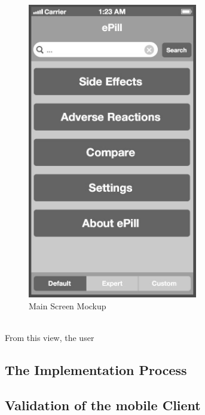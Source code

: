 \begin{figure}[!htb]
    \center
    \includegraphics[width=20em]{figures/Screen_1_bw}
    \caption[Main Screen Mockup]{Main Screen Mockup}
    \label{fig:Mockup}
\end{figure}
\\
From this view, the user 

\subsection{The Implementation Process}
\label{subsec:Implementation}

\subsection{Validation of the mobile Client}
\label{subsec:Validation}